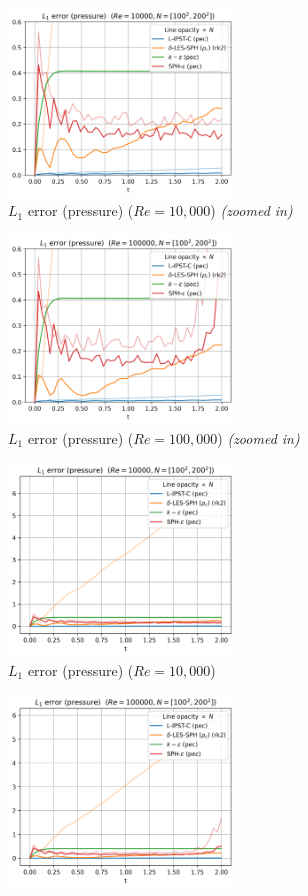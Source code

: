 \begin{figure}[htbp!]
  \begin{subfigure}{7cm}
  \centering\includegraphics[width=6cm]{Code-Figures/long-tgv/limit_p_l1_re_10000.png}
  \caption{$L_1$ error (pressure) ($Re = 10,000$) \textit{(zoomed in)}}
  \end{subfigure}
  \begin{subfigure}{7cm}
  \centering\includegraphics[width=6cm]{Code-Figures/long-tgv/limit_p_l1_re_100000.png}
  \caption{$L_1$ error (pressure) ($Re = 100,000$) \textit{(zoomed in)}}
  \end{subfigure}
  \begin{subfigure}{7cm}
  \centering\includegraphics[width=6cm]{Code-Figures/long-tgv/p_l1_re_10000.png}
  \caption{$L_1$ error (pressure) ($Re = 10,000$)}
  \end{subfigure}
  \begin{subfigure}{7cm}
  \centering\includegraphics[width=6cm]{Code-Figures/long-tgv/p_l1_re_100000.png}

\end{subfigure}
\end{figure}
